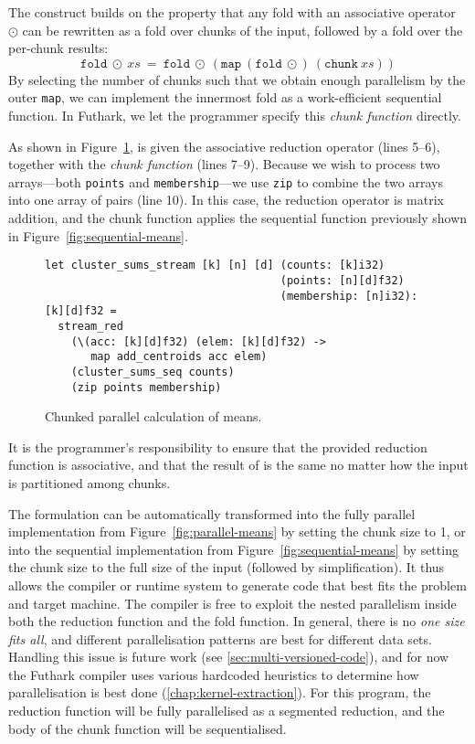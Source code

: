 The \StreamRed{} construct builds on the property that any fold
with an associative operator $\odot$ can be rewritten as a fold over
chunks of the input, followed by a fold over the per-chunk results:
\[
   \texttt{fold}\ \odot\ xs\ =\ \texttt{fold}\ \odot\ (\texttt{map}\ (\texttt{fold}\ \odot)\ (\texttt{chunk}\ xs))
\]
By selecting the number of chunks such that we obtain enough
parallelism by the outer \texttt{map}, we can implement the innermost
fold as a work-efficient sequential function.  In Futhark, we let the
programmer specify this \textit{chunk function} directly.

As shown in Figure~\ref{fig:stream-means}, \StreamRed{} is given
the associative reduction operator (lines 5--6), together with the
\textit{chunk function} (lines 7--9).  Because we wish to process two
arrays---both \texttt{points} and \texttt{membership}---we use
\texttt{zip} to combine the two arrays into one array of pairs (line
10).  In this case, the reduction operator is matrix addition, and the
chunk function applies the sequential function previously shown in
Figure~\ref{fig:sequential-means}.

\begin{figure}
\begin{lstlisting}
let cluster_sums_stream [k] [n] [d] (counts: [k]i32)
                                    (points: [n][d]f32)
                                    (membership: [n]i32): [k][d]f32 =
  stream_red
    (\(acc: [k][d]f32) (elem: [k][d]f32) ->
       map add_centroids acc elem)
    (cluster_sums_seq counts)
    (zip points membership)
\end{lstlisting}
\caption{Chunked parallel calculation of means.}
\label{fig:stream-means}
\end{figure}

It is the programmer's responsibility to ensure that the provided
reduction function is associative, and that the result of
\StreamRed{} is the same no matter how the input is partitioned
among chunks.

The \StreamRed{} formulation can be automatically transformed into the
fully parallel implementation from Figure~\ref{fig:parallel-means} by
setting the chunk size to 1, or into the sequential implementation
from Figure~\ref{fig:sequential-means} by setting the chunk size to
the full size of the input (followed by simplification).  It thus
allows the compiler or runtime system to generate code that best fits
the problem and target machine.  The compiler is free to exploit the
nested parallelism inside both the reduction function and the fold
function.  In general, there is no \textit{one size fits all}, and
different parallelisation patterns are best for different data sets.
Handling this issue is future work (see
\cref{sec:multi-versioned-code}), and for now the Futhark compiler
uses various hardcoded heuristics to determine how parallelisation is
best done (\cref{chap:kernel-extraction}).  For this program, the
reduction function will be fully parallelised as a segmented
reduction, and the body of the chunk function will be sequentialised.

